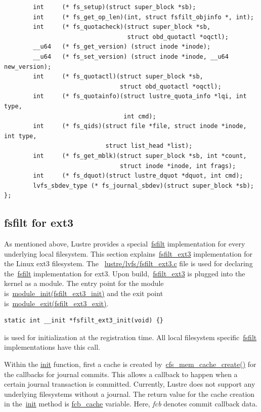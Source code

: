 \begin{Verbatim}
        int     (* fs_setup)(struct super_block *sb);
        int     (* fs_get_op_len)(int, struct fsfilt_objinfo *, int);
        int     (* fs_quotacheck)(struct super_block *sb,
                                  struct obd_quotactl *oqctl);
        __u64   (* fs_get_version) (struct inode *inode);
        __u64   (* fs_set_version) (struct inode *inode, __u64 new_version);
        int     (* fs_quotactl)(struct super_block *sb,
                                struct obd_quotactl *oqctl);
        int     (* fs_quotainfo)(struct lustre_quota_info *lqi, int type,
                                 int cmd);
        int     (* fs_qids)(struct file *file, struct inode *inode, int type,
                            struct list_head *list);
        int     (* fs_get_mblk)(struct super_block *sb, int *count,
                                struct inode *inode, int frags);
        int     (* fs_dquot)(struct lustre_dquot *dquot, int cmd);
        lvfs_sbdev_type (* fs_journal_sbdev)(struct super_block *sb);
};

\end{Verbatim}

\subsection{fsfilt for ext3}
\label{sec:fsfilt_ext3}

As mentioned above, Lustre provides a special~\url{fsfilt} implementation for
every underlying local filesystem. This section explains~\url{fsfilt_ext3}
implementation for the Linux ext3 filesystem. The
~\url{lustre/lvfs/fsfilt_ext3.c} file is used for declaring the~\url{fsfilt}
implementation for ext3. Upon build,~\url{fsfilt_ext3} is plugged into the
kernel as a module. The entry point for the module
is~\url{module_init(fsfilt_ext3_init)} and the exit point
is~\url{module_exit(fsfilt_ext3_exit)}.
 
\begin{Verbatim}
static int __init *fsfilt_ext3_init(void) {}
\end{Verbatim}

is used for initialization at the registration time. All local filesystem
specific~\url{fsfilt} implementations have this call.

Within the \url{init} function, first a cache is created
by~\url{cfs_mem_cache_create()} for the callbacks for journal commits. This
allows a callback to happen when a certain journal transaction is committed.
Currently, Lustre does not support any underlying filesystems without a
journal. The return value for the cache creation in the~\url{init} method is
\url{fcb_cache} variable. Here, \emph{fcb} denotes commit callback data.

